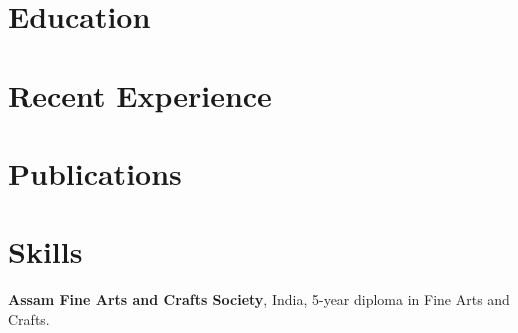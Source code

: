 




\thispagestyle{empty}
	
	
	
	
	
	\section{Education}	
	
	

	\section{Recent Experience}
	
	

	

	
	
	\section{Publications}
	
	

	\section{Skills}

	

	\textbf{Assam Fine Arts and Crafts Society}, India, 5-year diploma in Fine Arts and Crafts.


